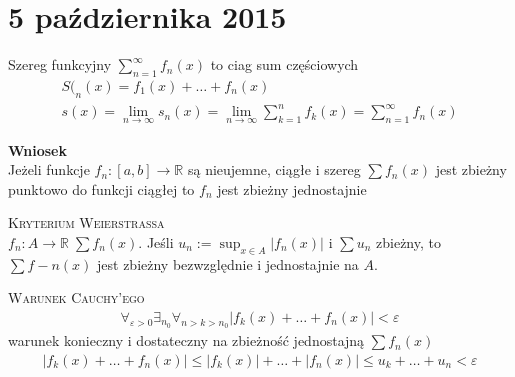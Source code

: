 \chapter{5 października 2015}
Szereg funkcyjny $ \sum_{n=1}^{\infty }f_n(x) $ to ciag sum częściowych
\begin{gather*}
S(_n(x)=f_1(x)+\dots+f_n(x)\\
s(x)=\lim\limits_{n\to\infty} s_n(x)
=
\lim\limits_{n\to\infty} \sum_{k=1}^{n}f_k(x)
=
\sum_{n=1}^{\infty }f_n(x)
\end{gather*}

\textbf{Wniosek}\\
Jeżeli funkcje $ f_n:[a,b]\to \mathbb R  $ są nieujemne, ciągłe i szereg $ \sum f_n(x) $ jest zbieżny punktowo do funkcji ciągłej to $ f_n $ jest zbieżny jednostajnie

\textsc{Kryterium Weierstrassa}\\
$ f_n:A\to \mathbb R \; \sum f_n(x) $. Jeśli $ u_n:=\sup_{x\in A}\left|f_n(x)\right| $ i $ \sum u_n $ zbieżny, to $ \sum f-n(x) $ jest zbieżny bezwzględnie i jednostajnie na $ A $.

\textsc{Warunek Cauchy'ego}\\
\begin{gather*}
\forall_{\varepsilon>0}\exists_{n_0}\forall_{n>k>n_0}
\left|f_k(x)+\dots+f_n(x)\right|<\varepsilon
\end{gather*}
warunek konieczny i dostateczny na zbieżność jednostajną $ \sum f_n(x) $
\begin{gather*}
\left|f_k(x)+\dots+f_n(x)\right|
\le
\left|f_k(x)\right|+\dots+\left|f_n(x)\right|
\le
u_k+\dots+u_n<\varepsilon
\end{gather*}


